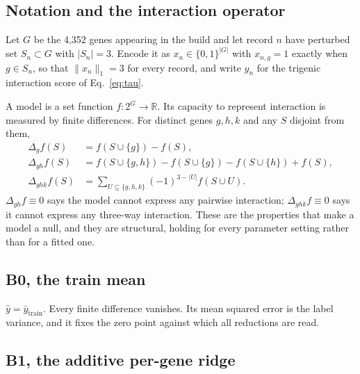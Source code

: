 \subsection{Notation and the interaction operator}

Let $G$ be the 4{,}352 genes appearing in the build and let record $n$ have
perturbed set $S_n \subset G$ with $|S_n| = 3$. Encode it as
$x_n \in \{0,1\}^{|G|}$ with $x_{n,g} = 1$ exactly when $g \in S_n$, so that
$\lVert x_n \rVert_1 = 3$ for every record, and write $y_n$ for the trigenic
interaction score of Eq.~\ref{eq:tau}.

A model is a set function $f : 2^{G} \to \mathbb{R}$. Its capacity to represent
interaction is measured by finite differences. For distinct genes $g, h, k$ and
any $S$ disjoint from them,
%
\begin{align}
  \Delta_g f(S) &= f(S \cup \{g\}) - f(S), \\
  \Delta_{gh} f(S) &= f(S \cup \{g,h\}) - f(S \cup \{g\}) - f(S \cup \{h\}) + f(S),
  \label{eq:delta2}\\
  \Delta_{ghk} f(S) &= \sum_{U \subseteq \{g,h,k\}} (-1)^{3-|U|} f(S \cup U).
  \label{eq:delta3}
\end{align}
%
$\Delta_{gh} f \equiv 0$ says the model cannot express any pairwise interaction;
$\Delta_{ghk} f \equiv 0$ says it cannot express any three-way interaction. These
are the properties that make a model a null, and they are structural, holding for
every parameter setting rather than for a fitted one.

\subsection{B0, the train mean}

$\hat{y} = \bar{y}_{\mathrm{train}}$. Every finite difference vanishes. Its mean
squared error is the label variance, and it fixes the zero point against which all
reductions are read.

\subsection{B1, the additive per-gene ridge}

